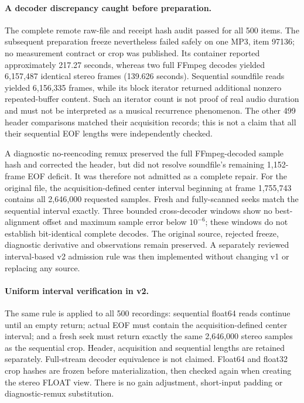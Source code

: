 \paragraph{A decoder discrepancy caught before preparation.}
The complete remote raw-file and receipt hash audit passed for all 500 items.
The subsequent preparation freeze nevertheless failed safely on one MP3,
item 97136; no measurement contract or crop was published. Its container
reported approximately 217.27 seconds, whereas two full FFmpeg decodes yielded
6,157,487 identical stereo frames (139.626 seconds). Sequential soundfile
reads yielded 6,156,335 frames, while its block iterator returned additional
nonzero repeated-buffer content. Such an iterator count is not proof of real
audio duration and must not be interpreted as a musical recurrence phenomenon.
The other 499 header comparisons matched their acquisition records; this is
not a claim that all their sequential EOF lengths were independently checked.

A diagnostic no-reencoding remux preserved the full FFmpeg-decoded sample
hash and corrected the header, but did not resolve soundfile's remaining
1,152-frame EOF deficit. It was therefore not admitted as a complete repair.
For the original file, the acquisition-defined center interval beginning at
frame 1,755,743 contains all 2,646,000 requested samples. Fresh and fully-scanned
seeks match the sequential interval exactly. Three bounded cross-decoder
windows show no best-alignment offset and maximum sample error below
\(10^{-6}\); these windows do not establish bit-identical complete decodes.
The original source, rejected freeze, diagnostic derivative and observations
remain preserved. A separately reviewed interval-based v2 admission rule was
then implemented without changing v1 or replacing any source.

\paragraph{Uniform interval verification in v2.}
The same rule is applied to all 500 recordings: sequential float64 reads
continue until an empty return; actual EOF must contain the acquisition-defined
center interval; and a fresh seek must return exactly the same 2,646,000 stereo
samples as the sequential crop. Header, acquisition and sequential lengths
are retained separately. Full-stream decoder equivalence is not claimed.
Float64 and float32 crop hashes are frozen before materialization, then checked
again when creating the stereo FLOAT view. There is no gain adjustment,
short-input padding or diagnostic-remux substitution.

